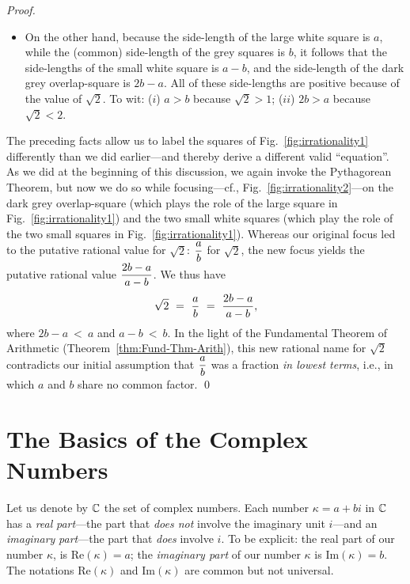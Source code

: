 \begin{proof}
\begin{itemize}
\item
On the other hand, because the side-length of the large white square is $a$, while the (common) side-length of the grey squares is $b$, it follows that the side-lengths of the small white square is $a-b$, and the side-length of the dark grey overlap-square is $2b-a$.  All of these side-lengths are positive because of the value of $\sqrt{2}$.  To wit: ($i$) $a > b$ because $\sqrt{2} >1$; ($ii$) $2b >a$ because $\sqrt{2} < 2$.
\end{itemize}
The preceding facts allow us to label the squares of Fig.~\ref{fig:irrationality1} differently than we did earlier---and thereby derive a different valid ``equation''.  As we did at the beginning of this discussion, we again invoke the Pythagorean Theorem, but now we do so while focusing---cf., Fig.~\ref{fig:irrationality2}---on the dark grey overlap-square (which plays the role of the large square in Fig.~\ref{fig:irrationality1}) and the two small white squares (which play the role of the two small squares in Fig.~\ref{fig:irrationality1}).  Whereas our original focus led to the putative rational value for $\sqrt{2}$: $\displaystyle {a \over b}$ for $\sqrt{2}$, the new focus yields the putative rational value $\displaystyle {2b-a \over a-b}$.  We thus have
\[ \sqrt{2} \ = \ {a \over b} \ = \ {2b-a \over a-b}, \]
where $2b-a \ < \ a$ and $a-b \ < \ b$.  In the light of the Fundamental Theorem of Arithmetic (Theorem~\ref{thm:Fund-Thm-Arith}), this new rational name for $\sqrt{2}$ contradicts our initial assumption that $\displaystyle {a \over b}$ was a fraction {\em in lowest  terms}, i.e., in which $a$ and $b$ share no common factor.  \qed
\end{proof}



\section{The Basics of the Complex Numbers}
\label{sec:complexes}

 
 
Let us denote by $\mathbb{C}$ the set of complex numbers.  Each number $\kappa = a+bi$ in $\mathbb{C}$ has a {\it real}  {\em part}---the part that {\em does not} involve the imaginary unit $i$---and an {\it imaginary} {\em part}---the part that {\em does} involve $i$.  To be explicit: the real part of our number $\kappa$, is Re$(\kappa) = a$; the {\it imaginary part} of our number $\kappa$ is Im$(\kappa) = b$.  The notations Re$(\kappa)$ and Im$(\kappa)$ are common but not universal.

